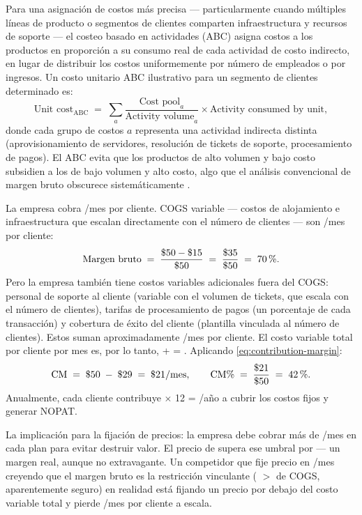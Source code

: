 Para una asignación de costos más precisa --- particularmente cuando múltiples líneas de producto o
segmentos de clientes comparten infraestructura y recursos de soporte --- el costeo basado en
actividades (ABC) asigna costos a los productos en proporción a su consumo real de cada actividad
de costo indirecto, en lugar de distribuir los costos uniformemente por número de empleados o por
ingresos. Un costo unitario ABC ilustrativo para un segmento de clientes determinado es:
\begin{equation}\label{eq:abc-cost}
  \text{Unit cost}_{\text{ABC}} \;=\; \sum_{a} \frac{\text{Cost pool}_a}{\text{Activity volume}_a} \times \text{Activity consumed by unit},
\end{equation}
donde cada grupo de costos \(a\) representa una actividad indirecta distinta (aprovisionamiento de
servidores, resolución de tickets de soporte, procesamiento de pagos). El ABC evita que los
productos de alto volumen y bajo costo subsidien a los de bajo volumen y alto costo, algo que el
análisis convencional de margen bruto obscurece sistemáticamente \parencite{datar2025horngrens}.

\begin{example}
La empresa cobra /mes por cliente. COGS variable --- costos de alojamiento e
infraestructura que escalan directamente con el número de clientes --- son /mes por
cliente:
\[
  \text{Margen bruto} \;=\; \frac{\$\num{50} - \$\num{15}}{\$\num{50}} \;=\; \frac{\$\num{35}}{\$\num{50}} \;=\; \qty{70}{\percent}.
\]
Pero la empresa también tiene costos variables adicionales fuera del COGS: personal de soporte al
cliente (variable con el volumen de tickets, que escala con el número de clientes), tarifas de
procesamiento de pagos (un porcentaje de cada transacción) y cobertura de éxito del cliente
(plantilla vinculada al número de clientes). Estos suman aproximadamente /mes por
cliente. El costo variable total por cliente por mes es, por lo tanto,  +  =
. Aplicando \cref{eq:contribution-margin}:
\[
  \mathrm{CM} \;=\; \$\num{50} \;-\; \$\num{29} \;=\; \$\num{21}/\text{mes},
  \qquad
  \mathrm{CM\%} \;=\; \frac{\$\num{21}}{\$\num{50}} \;=\; \qty{42}{\percent}.
\]
Anualmente, cada cliente contribuye  \(\times\) 12 = /año a cubrir los costos
fijos y generar NOPAT.

La implicación para la fijación de precios: la empresa debe cobrar más de /mes en cada
plan para evitar destruir valor. El precio de  supera ese umbral por  --- un
margen real, aunque no extravagante. Un competidor que fije precio en /mes creyendo que el
margen bruto es la restricción vinculante ( \(>\)  de COGS, aparentemente
seguro) en realidad está fijando un precio por debajo del costo variable total y pierde
/mes por cliente a escala.
\end{example}

